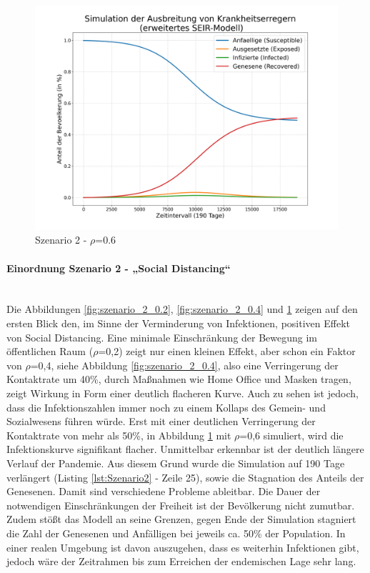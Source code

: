 \documentclass[12pt]{article}
\newcommand{\nocontentsline}[3]{}
\newcommand{\tocless}[2]{\bgroup\let\addcontentsline=\nocontentsline#1{#2}\egroup}
\begin{document}
\begin{figure}[H]
\centering
\includegraphics[scale=0.4]{Szenario_2_rho_0.6}
\caption{Szenario 2 - $\rho$=0.6}
\label{fig:szenario_2_0.6}
\end{figure}

\tocless \paragraph{Einordnung Szenario 2 - „Social Distancing“}\mbox{} \\
Die Abbildungen \ref{fig:szenario_2_0.2}, \ref{fig:szenario_2_0.4} und \ref{fig:szenario_2_0.6} zeigen auf den ersten Blick den, im Sinne der Verminderung von Infektionen, positiven Effekt von Social Distancing. Eine minimale Einschränkung der Bewegung im öffentlichen Raum ($\rho$=0,2) zeigt nur einen kleinen Effekt, aber schon ein Faktor von $\rho$=0,4, siehe Abbildung \ref{fig:szenario_2_0.4}, also eine Verringerung der Kontaktrate um 40\%, durch Maßnahmen wie Home Office und Masken tragen, zeigt Wirkung in Form einer deutlich flacheren Kurve. Auch zu sehen ist jedoch, dass die Infektionszahlen immer noch zu einem Kollaps des Gemein- und Sozialwesens führen würde. Erst mit einer deutlichen Verringerung der Kontaktrate von mehr als 50\%, in Abbildung \ref{fig:szenario_2_0.6} mit $\rho$=0,6 simuliert, wird die Infektionskurve signifikant flacher. Unmittelbar erkennbar ist der deutlich längere Verlauf der Pandemie. Aus diesem Grund wurde die Simulation auf 190 Tage verlängert (Listing \ref{lst:Szenario2} - Zeile 25), sowie die Stagnation des Anteils der Genesenen. Damit sind verschiedene Probleme ableitbar. Die Dauer der notwendigen Einschränkungen der Freiheit ist der Bevölkerung nicht zumutbar. Zudem stößt das Modell an seine Grenzen, gegen Ende der Simulation stagniert die Zahl der Genesenen und Anfälligen bei jeweils ca. 50\% der Population. In einer realen Umgebung ist davon auszugehen, dass es weiterhin Infektionen gibt, jedoch wäre der Zeitrahmen bis zum Erreichen der endemischen Lage sehr lang.
\end{document}
